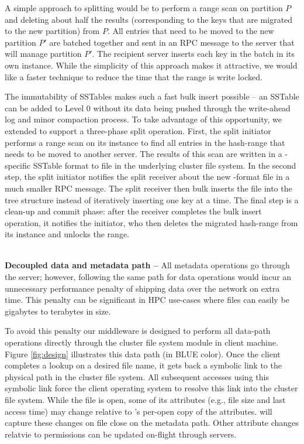 A simple approach to splitting would be to perform a \ldb range scan on 
partition $P$ and deleting about half the results (corresponding to the keys
that are migrated to the new partition) from $P$. 
All entries that need to be moved to the new partition $P'$ are batched
together and sent in an RPC message to the server that will manage partition 
$P'$.
The recipient server inserts each key in the batch in its own \tfs
instance. While the simplicity of this approach makes it attractive, we would
like a faster technique to reduce the time that the range is write locked. 

The immutability of \ldb SSTables makes such a fast bulk insert possible -- an
SSTable can be added to Level 0 without its data being pushed through the
write-ahead log and minor compaction process.
To take advantage of this opportunity, we extended \tfs
to support a three-phase split operation. 
First, the split initiator performs a range scan on its \tfs instance to find all
entries in the hash-range that needs to be moved to another server. The results
of this scan are written in a \tfs-specific SSTable format to file in the
underlying cluster file system. 
In the second step, the split initiator notifies the split receiver about
the new \tfs-format file in a much smaller RPC message.
The split receiver then bulk inserts the file into the \tfs tree structure 
instead of iteratively inserting one key at a time.
The final step is a clean-up and commit phase: after the receiver completes the 
bulk insert operation, it notifies the 
initiator, who then deletes the migrated hash-range from its \tfs instance
and unlocks the range.%

~\\
\textbf{Decoupled data and metadata path -- }
All metadata operations go through the \giga{} server; however, following the
same path for data operations would incur an unnecessary performance penalty 
of shipping data over the network on extra time. 
This penalty can be significant in HPC use-cases where files can easily be  
gigabytes to terabytes in size.

To avoid this penalty our middleware is designed to perform all
data-path operations directly through the cluster file system module in client
machine. 
Figure \ref{fig:design} illustrates this data path (in BLUE color).
Once the client completes a
lookup on a desired file name, it gets back a symbolic link to the physical
path in the cluster file system. All subsequent accesses using this symbolic
link force the client operating system to resolve this link into the cluster
file system.
While the file is open, some of its attributes (e.g., file size and last access time)
may change relative to \ldb's per-open
copy of the attributes. \giga will capture these changes on file close on the
metadata path. Other attribute changes relatvie to permissions can be updated on-flight
through \giga servers. 


